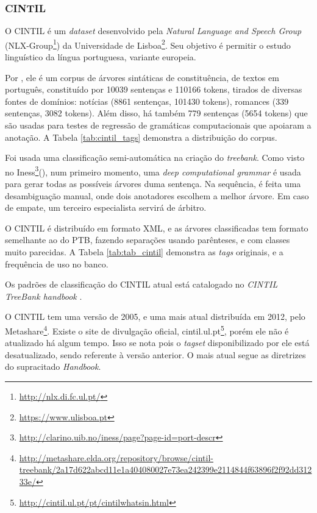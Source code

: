 \subsubsection{CINTIL}
\label{subsec:cintil}
O CINTIL é um \textit{dataset} desenvolvido pela \textit{Natural Language and Speech Group} (NLX-Group\footnote{ \url{http://nlx.di.fc.ul.pt/}}) da Universidade de Lisboa\footnote{\url{https://www.ulisboa.pt}}. Seu objetivo é permitir o estudo linguístico da língua portuguesa, variante europeia.

Por , ele é um corpus de árvores sintáticas de constituência, de textos em português, constituído por 10039 sentenças e 110166 tokens, tirados de diversas fontes de domínios: notícias (8861 sentenças, 101430 tokens), romances (339 sentenças, 3082 tokens). Além disso, há também 779 sentenças (5654 tokens) que são usadas para testes de regressão de gramáticas computacionais que apoiaram a anotação. A Tabela \ref{tab:cintil_tags} demonstra a distribuição do corpus.

\begin{center}

\end{center}

Foi usada uma classificação semi-automática na criação do \textit{treebank}. Como visto no Iness\footnote{\url{http://clarino.uib.no/iness/page?page-id=port-descr}}(), num primeiro momento, uma \textit{deep computational grammar}  é usada para gerar todas as possíveis árvores duma sentença. Na sequência, é feita uma desambiguação manual, onde dois anotadores escolhem a melhor árvore. Em caso de empate, um terceiro especialista servirá de árbitro.

O CINTIL é distribuído em formato XML, e as árvores classificadas tem formato semelhante ao do PTB, fazendo separações usando parênteses, e com classes muito parecidas. A Tabela \ref{tab:tab_cintil} demonstra as \textit{tags} originais, e a frequência de uso no banco.

Os padrões de classificação do CINTIL atual está catalogado no \textit{CINTIL TreeBank handbook} .

O CINTIL tem uma versão de 2005, e uma mais atual distribuída em 2012, pelo Metashare\footnote{\url{http://metashare.elda.org/repository/browse/cintil-treebank/2a17d622abcd11e1a404080027e73ea242399e2114844f63896f2f92dd31233e/}}. Existe o site de divulgação oficial, cintil.ul.pt\footnote{\url{http://cintil.ul.pt/pt/cintilwhatsin.html}}, porém ele não é atualizado há algum tempo. Isso se nota pois o \textit{tagset} disponibilizado por ele está desatualizado, sendo referente à versão anterior. O mais atual segue as diretrizes do supracitado \textit{Handbook}.
